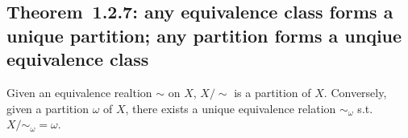 \documentclass[11pt]{elegantbook}
\begin{document}
\subsection{Theorem 1.2.7: any equivalence class forms a unique partition; any partition forms a unqiue equivalence class}
\begin{theorem}[Theorem 1.2.7]
    Given an equivalence realtion $\sim$ on $X$, $X/\sim$ is a partition of $X$. Conversely, given a partition $\omega$ of $X$, there exists a unique equivalence relation $\sim_\omega$ s.t. $X/\sim_\omega=\omega$.
\end{theorem}
\end{document}
